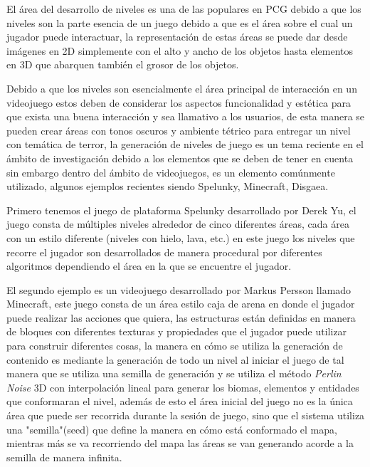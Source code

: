 El área del desarrollo de niveles es una de las populares en PCG debido a que
los niveles son la parte esencia de un juego debido a que es el área sobre el
cual un jugador puede interactuar, la representación de estas áreas se puede dar
desde imágenes en 2D simplemente con el alto y ancho de los objetos hasta
elementos en 3D que abarquen también el grosor de los objetos.

Debido a que los niveles son esencialmente el área principal de interacción en
un videojuego estos deben de considerar los aspectos funcionalidad y estética
para que exista una buena interacción y sea llamativo a los usuarios, de esta
manera se pueden crear áreas con tonos oscuros y ambiente tétrico para entregar
un nivel con temática de terror, la generación de niveles de juego es un tema
reciente en el ámbito de investigación debido a los elementos que se deben de
tener en cuenta sin embargo dentro del ámbito de videojuegos, es un elemento
comúnmente utilizado, algunos ejemplos recientes siendo Spelunky, Minecraft,
Disgaea.

Primero tenemos el juego de plataforma Spelunky desarrollado por Derek Yu, el
juego consta de múltiples niveles alrededor de cinco diferentes áreas, cada área
con un estilo diferente (niveles con hielo, lava, etc.) en este juego los niveles
que recorre el jugador son desarrollados de manera procedural por diferentes
algoritmos dependiendo el área en la que se encuentre el jugador.

El segundo ejemplo es un videojuego desarrollado por Markus Persson llamado
Minecraft, este juego consta de un área estilo caja de arena en donde el jugador
puede realizar las acciones que quiera, las estructuras están definidas en
manera de bloques con diferentes texturas y propiedades que el jugador puede
utilizar para construir diferentes cosas, la manera en cómo se utiliza la
generación de contenido es mediante la generación de todo un nivel al iniciar el
juego de tal manera que se utiliza una semilla de generación y se utiliza el
método \textit{Perlin Noise} 3D con interpolación lineal para generar los biomas,
elementos y entidades que conformaran el nivel, además de esto el área inicial
del juego no es la única área que puede ser recorrida durante la sesión de
juego, sino que el sistema utiliza una "semilla"(seed) que define la manera en
cómo está conformado el mapa, mientras más se va recorriendo del mapa las áreas
se van generando acorde a la semilla de manera infinita.

